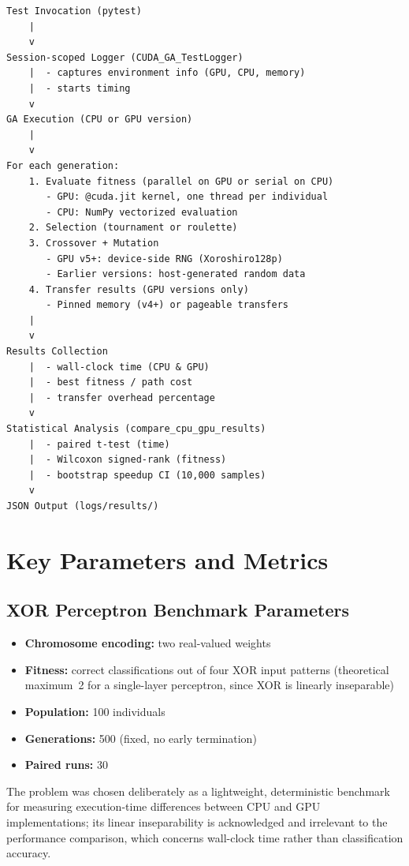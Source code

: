 \documentclass[a4paper,14pt]{extarticle}
\begin{document}
\begin{verbatim}
Test Invocation (pytest)
    |
    v
Session-scoped Logger (CUDA_GA_TestLogger)
    |  - captures environment info (GPU, CPU, memory)
    |  - starts timing
    v
GA Execution (CPU or GPU version)
    |
    v
For each generation:
    1. Evaluate fitness (parallel on GPU or serial on CPU)
       - GPU: @cuda.jit kernel, one thread per individual
       - CPU: NumPy vectorized evaluation
    2. Selection (tournament or roulette)
    3. Crossover + Mutation
       - GPU v5+: device-side RNG (Xoroshiro128p)
       - Earlier versions: host-generated random data
    4. Transfer results (GPU versions only)
       - Pinned memory (v4+) or pageable transfers
    |
    v
Results Collection
    |  - wall-clock time (CPU & GPU)
    |  - best fitness / path cost
    |  - transfer overhead percentage
    v
Statistical Analysis (compare_cpu_gpu_results)
    |  - paired t-test (time)
    |  - Wilcoxon signed-rank (fitness)
    |  - bootstrap speedup CI (10,000 samples)
    v
JSON Output (logs/results/)
\end{verbatim}


\section{Key Parameters and Metrics}

\subsection{XOR Perceptron Benchmark Parameters}

\begin{itemize}
  \item \textbf{Chromosome encoding:} two real-valued weights
  \item \textbf{Fitness:} correct classifications out of four XOR input patterns (theoretical
        maximum~2 for a single-layer perceptron, since XOR is linearly inseparable)
  \item \textbf{Population:} 100 individuals
  \item \textbf{Generations:} 500 (fixed, no early termination)
  \item \textbf{Paired runs:} 30
\end{itemize}

The problem was chosen deliberately as a lightweight, deterministic benchmark for measuring
execution-time differences between CPU and GPU implementations; its linear inseparability is
acknowledged and irrelevant to the performance comparison, which concerns wall-clock time
rather than classification accuracy.
\end{document}
